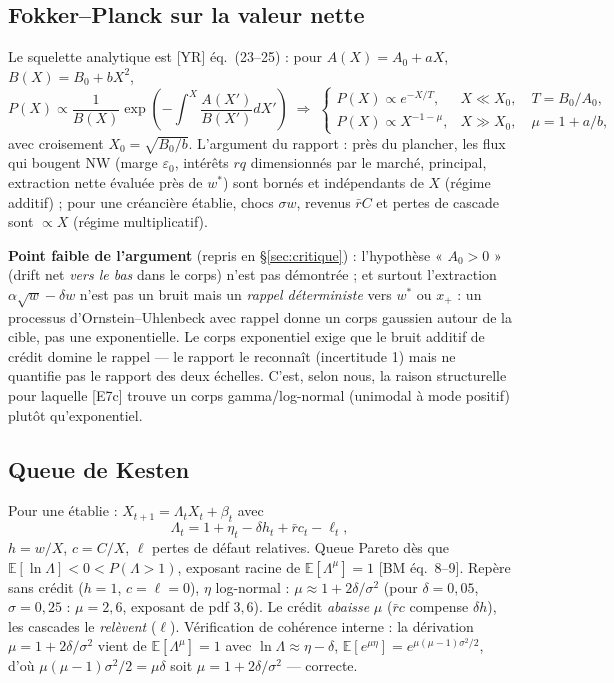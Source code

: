 \documentclass[11pt,a4paper]{article}
\newcommand{\NW}{\mathrm{NW}}
\newcommand{\E}{\mathbb{E}}
\begin{document}
\subsection{Fokker--Planck sur la valeur nette}
Le squelette analytique est [YR] éq.~(23--25) : pour
$A(X) = A_0 + aX$, $B(X) = B_0 + bX^2$,
\begin{equation}
P(X) \propto \frac{1}{B(X)} \exp\left( -\int^X \frac{A(X')}{B(X')} dX' \right)
\;\Longrightarrow\;
\begin{cases}
P(X) \propto e^{-X/T}, & X \ll X_0, \quad T = B_0/A_0,\\[2pt]
P(X) \propto X^{-1-\mu}, & X \gg X_0, \quad \mu = 1 + a/b,
\end{cases}
\end{equation}
avec croisement $X_0 = \sqrt{B_0/b}$. L'argument du rapport : près du
plancher, les flux qui bougent $\NW$ (marge $\varepsilon_0$, intérêts $rq$
dimensionnés par le marché, principal, extraction nette évaluée près de
$w^*$) sont bornés et indépendants de $X$ (régime additif) ; pour une
créancière établie, chocs $\sigma w$, revenus $\bar r C$ et pertes de cascade
sont $\propto X$ (régime multiplicatif).

\textbf{Point faible de l'argument} (repris en \S\ref{sec:critique}) :
l'hypothèse « $A_0 > 0$ » (drift net \emph{vers le bas} dans le corps) n'est
pas démontrée ; et surtout l'extraction $\alpha\sqrt{w} - \delta w$ n'est pas
un bruit mais un \emph{rappel déterministe} vers $w^*$ ou $x_+$ : un
processus d'Ornstein--Uhlenbeck avec rappel donne un corps gaussien autour de
la cible, pas une exponentielle. Le corps exponentiel exige que le bruit
additif de crédit domine le rappel — le rapport le reconnaît (incertitude 1)
mais ne quantifie pas le rapport des deux échelles. C'est, selon nous, la
raison structurelle pour laquelle [E7c] trouve un corps gamma/log-normal
(unimodal à mode positif) plutôt qu'exponentiel.

\subsection{Queue de Kesten}
Pour une établie : $X_{t+1} = \Lambda_t X_t + \beta_t$ avec
\begin{equation}
\Lambda_t = 1 + \eta_t - \delta h_t + \bar r c_t - \ell_t,
\end{equation}
$h = w/X$, $c = C/X$, $\ell$ pertes de défaut relatives. Queue Pareto dès que
$\E[\ln\Lambda] < 0 < P(\Lambda > 1)$, exposant racine de
$\E[\Lambda^\mu] = 1$ [BM éq.~8--9]. Repère sans crédit ($h=1$, $c=\ell=0$),
$\eta$ log-normal : $\mu \approx 1 + 2\delta/\sigma^2$ (pour
$\delta = 0{,}05$, $\sigma = 0{,}25$ : $\mu = 2{,}6$, exposant de pdf
$3{,}6$). Le crédit \emph{abaisse} $\mu$ ($\bar r c$ compense $\delta h$), les
cascades le \emph{relèvent} ($\ell$). Vérification de cohérence interne : la
dérivation $\mu = 1 + 2\delta/\sigma^2$ vient de
$\E[\Lambda^\mu] = 1$ avec $\ln\Lambda \approx \eta - \delta$,
$\E[e^{\mu\eta}] = e^{\mu(\mu-1)\sigma^2/2}$, d'où
$\mu(\mu-1)\sigma^2/2 = \mu\delta$ soit $\mu = 1 + 2\delta/\sigma^2$ —
correcte.
\end{document}
